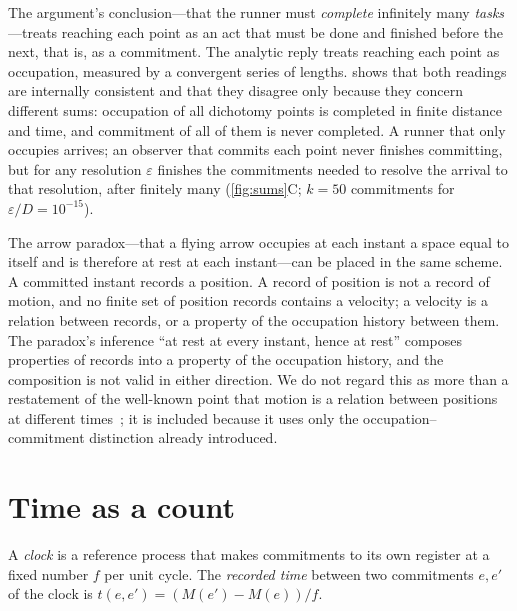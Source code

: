 \documentclass[10pt,twocolumn,a4paper]{article}
\begin{document}
The argument's conclusion---that the runner must \emph{complete} infinitely
many \emph{tasks}---treats reaching each point as an act that must be done
and finished before the next, that is, as a commitment. The analytic reply
treats reaching each point as occupation, measured by a convergent series of
lengths.  shows that both readings are internally
consistent and that they disagree only because they concern different sums:
occupation of all dichotomy points is completed in finite distance and time,
and commitment of all of them is never completed. A runner that only
occupies arrives; an observer that commits each point never finishes
committing, but for any resolution $\varepsilon$ finishes the commitments
needed to resolve the arrival to that resolution, after finitely many
(\cref{fig:sums}C; $k=50$ commitments for $\varepsilon/D=10^{-15}$).

The arrow paradox---that a flying arrow occupies at each instant a space equal
to itself and is therefore at rest at each instant---can be placed in the
same scheme. A committed instant records a position. A record of position is
not a record of motion, and no finite set of position records contains a
velocity; a velocity is a relation between records, or a property of the
occupation history between them. The paradox's inference ``at rest at every
instant, hence at rest'' composes properties of records into a property of
the occupation history, and the composition is not valid in either
direction. We do not regard this as more than a restatement of the
well-known point that motion is a relation between positions at different
times~\citep{salmon2001}; it is included because it uses only the
occupation--commitment distinction already introduced.

\section{Time as a count}
\label{sec:time}

\begin{definition}
\label{def:clock}
A \emph{clock} is a reference process that makes commitments to its own
register at a fixed number $f$ per unit cycle. The \emph{recorded time}
between two commitments $e,e'$ of the clock is $t(e,e')=(M(e')-M(e))/f$.
\end{definition}
\end{document}
